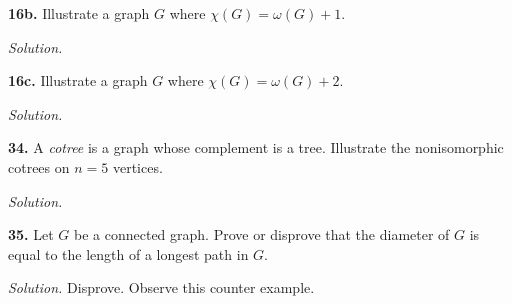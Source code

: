 \documentclass{article}
\begin{document}
\vspace{4mm}

\textbf{16b.} Illustrate a graph \(G\) where \(\chi(G)=\omega(G)+1\). 


\vspace{2mm}

\textit{Solution.}
\begin{center}
\end{center}


\vspace{4mm}

\textbf{16c.} Illustrate a graph \(G\) where \(\chi(G)=\omega(G)+2\). 


\vspace{2mm}

\textit{Solution.}




\vspace{40mm}


\newpage
\textbf{34.} A \textit{cotree} is a graph whose complement is a tree. Illustrate the nonisomorphic cotrees on \(n=5\) vertices. 


\vspace{2mm}

\textit{Solution.}


\vspace{60mm}

\textbf{35.} Let \(G\) be a connected graph. Prove or disprove that the diameter of \(G\) is equal to the length of a longest path in \(G\). 


\vspace{2mm}

\textit{Solution.} Disprove. Observe this counter example.
\end{document}
